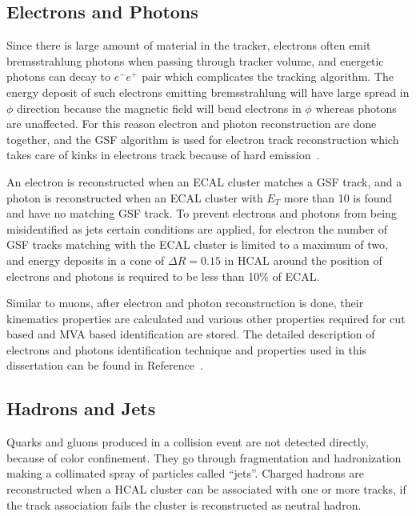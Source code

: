 \subsection{
  Electrons and Photons
}

Since there is large amount of material in the tracker, electrons often emit bremsstrahlung
photons when passing through tracker volume,
and energetic photons can decay to \( e^- e^+ \) pair which complicates the
tracking algorithm. The energy deposit of such electrons
emitting bremsstrahlung will have large spread in \( \phi \) direction because
the magnetic field will bend electrons in \( \phi \) whereas photons are unaffected.
For this reason electron and photon reconstruction are done together, and
the \gls{GSF} algorithm is used for electron track reconstruction
which takes care of kinks in electrons track because of hard emission~\cite{cms-electron-gsf}.

An electron is reconstructed when an \gls{ECAL} cluster matches a \gls{GSF} track,
and a photon is reconstructed when an \gls{ECAL} cluster with \( E_T \)
more than 10\GeV{} is found and have no matching \gls{GSF} track. To prevent
electrons and photons from being misidentified as jets certain conditions are applied,
for electron the number of \gls{GSF} tracks matching with the \gls{ECAL} cluster is limited to
a maximum of two, and energy deposits in a cone of \( \Delta R = 0.15 \) in \gls{HCAL}
around the position of electrons and photons is required to be less than 10\% of \gls{ECAL}.

Similar to muons, after electron and photon reconstruction is done, their kinematics properties
are calculated and various other properties required for cut based
and \gls{MVA} based identification are stored. The detailed description of electrons
and photons identification technique and properties used in this dissertation
can be found in Reference~\cite{cms-egamma-id}.

\subsection{
  Hadrons and Jets
}\label{ch_reco:jets}

Quarks and gluons produced in a collision event are not detected directly,
because of color confinement. They go through fragmentation and
hadronization making a collimated spray of particles called ``jets''.
Charged hadrons are reconstructed when a \gls{HCAL} cluster can be associated with
one or more tracks, if the track association fails the cluster is reconstructed as
neutral hadron.

